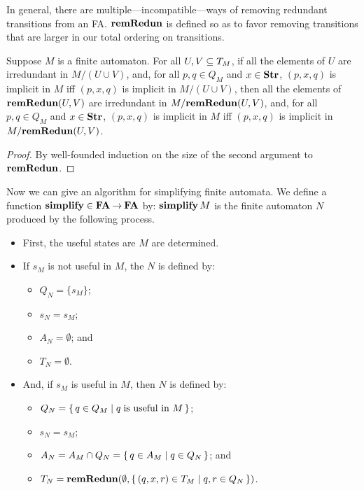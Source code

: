 In general, there are multiple---incompatible---ways of removing
redundant transitions from an FA.  $\mathbf{remRedun}$ is defined so as to
favor removing transitions that are larger in our total ordering on
transitions.

\begin{proposition}
\label{RemRedunFA}
Suppose $M$ is a finite automaton.  For all $U,V\subseteq T_M$, if all the
elements of $U$ are irredundant in $M/(U\cup V)$, and, for all $p,q\in Q_M$
and $x\in\mathbf{Str}$, $(p,x,q)$ is implicit in $M$ iff $(p,x,q)$ is implicit
in $M/(U\cup V)$, then all the elements of $\mathbf{remRedun}(U,V)$ are
irredundant in $M/\mathbf{remRedun}(U,V)$, and, for all $p,q\in Q_M$ and
$x\in\mathbf{Str}$, $(p,x,q)$ is implicit in $M$ iff $(p,x,q)$ is implicit in
$M/\mathbf{remRedun}(U,V)$.
\end{proposition}

\begin{proof}
By well-founded induction on the size of the second argument to
$\mathbf{remRedun}$.
\end{proof}

Now we can give an algorithm for simplifying finite automata.
%
%
We define a function $\mathbf{simplify}\in\mathbf{FA}\mathbin{\to}\mathbf{FA}$ by: $\mathbf{simplify}\,M$ is
%
%
%
the finite automaton $N$ produced by the following process.
\begin{itemize}
\item First, the useful states are $M$ are determined.

\item If $s_M$ is not useful in $M$, the $N$ is defined by:
\begin{itemize}
\item $Q_N=\{s_M\}$;

\item $s_N = s_M$;

\item $A_N=\emptyset$; and

\item $T_N=\emptyset$.
\end{itemize}

\item And, if $s_M$ is useful in $M$, then $N$ is defined by:
\begin{itemize}
\item $Q_N=\{ \, q\in Q_M \mid q\;\allowbreak\mbox{is useful in $M$}\allowbreak \, \}$;

\item $s_N = s_M$;

\item $A_N=A_M\cap Q_N=\{ \, q\in A_M \mid q\in Q_N \, \}$; and

\item $T_N=\mathbf{remRedun}(\emptyset, \{ \, (q, x, r)\in T_M \mid q,r\in Q_N \, \})$.
\end{itemize}
\end{itemize}

